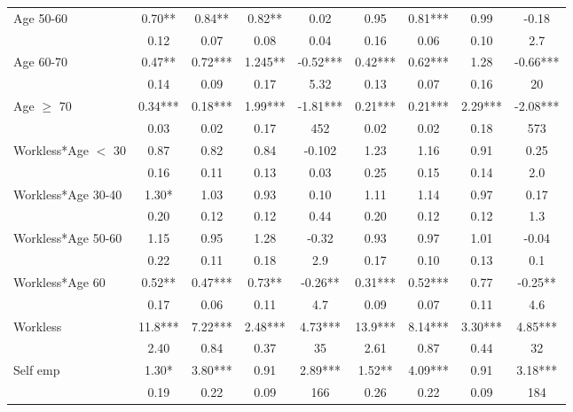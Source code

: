 \begin{table}
\begin{tabular}{l|cccc|cccc}
Age 50-60	&	       0.70**  	&	0.84**	&	0.82**	&	0.02	&	
			       0.95   	&	       0.81***  	&	0.99	&	-0.18	\\
                    	&	       0.12  	&	0.07	&	0.08	&	0.04	&	
			       0.16   	&	0.06	&	0.10	&	2.7	\\
Age 60-70	&	       0.47** 	&	0.72***	&	       1.245**	&	-0.52***	
		&	       0.42*** 	&	       0.62***	&	1.28	&	-0.66***	\\
                    	&	       0.14   	&	0.09	&	0.17	&	5.32	&	
			       0.13   	&	0.07	&	0.16	&	20	\\
Age $\geq$ 70	&	       0.34***	&	       0.18***	&	       1.99***	&	-1.81***	&	       						0.21***	&	       0.21***	&	       2.29***	&	-2.08***	\\
                    	&	       0.03   	&	0.02	&	0.17	&	452	&	
			      0.02   	&	0.02	&	0.18	&	573	\\
Workless*Age $<$ 30	&	       0.87   	&	0.82	&	0.84	&	-0.102
				&	       1.23   	&	1.16	&	0.91	&	0.25	\\
				&	       0.16  	&	0.11	&	0.13	&	0.03	&	
					   0.25   	&	0.15	&	0.14	&	2.0	\\
Workless*Age 30-40	&	       1.30*   	&	1.03	&	0.93	&	0.10	&	
				       1.11   	&	1.14	&	0.97	&	0.17	\\
			&	       0.20   	&	0.12	&	0.12	&	0.44	&	
				      0.20   	&	0.12	&	0.12	&	1.3	\\
Workless*Age 50-60	&	       1.15  	&	0.95	&	1.28	&	-0.32	&	
				       0.93   	&	0.97	&	1.01	&	-0.04	\\
			&	       0.22   	&	0.11	&	0.18	&	2.9	&	
				   0.17   	&	0.10	&	0.13	&	0.1	\\
Workless*Age 60	&	       0.52**   	&	       0.47***	&	       0.73**  	&	-0.26**	&	
			   0.31***	&	       0.52***	&	0.77	&	-0.25**	\\
	&	       0.17   	&	0.06	&	0.11	&	4.7	&	
		       0.09   	&	0.07	&	0.11	&	4.6	\\
Workless	&	       11.8***	&	       7.22***	&	       2.48***	&	4.73***	
		&	       13.9***	&	       8.14***	&	       3.30***	&	4.85***	\\
		&	       2.40   	&	0.84	&	0.37	&	35	
		&	       2.61   	&	0.87	&	0.44	&	32	\\
Self emp	&	       1.30*	&	       3.80***	&	      0.91	&	2.89***	
		&	       1.52**	&	       4.09***	&	       0.91 &	3.18***	\\
		&	       0.19   	&	0.22	&	0.09	&	166	
		&	       0.26   	&	0.22	&	0.09	&	184	\\

\end{tabular}
\end{table}
